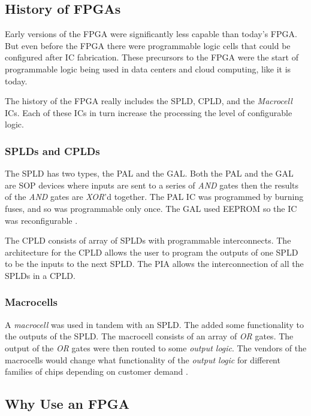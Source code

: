 \subsection{History of FPGAs}

Early versions of the \ac{FPGA} were significantly less capable than today's \ac{FPGA}. But even before the \ac{FPGA} there were programmable logic cells that could be configured after \ac{IC} fabrication. These precursors to the \ac{FPGA} were the start of programmable logic being used in data centers and cloud computing, like it is today.

The history of the \ac{FPGA} really includes the \ac{SPLD}, \ac{CPLD}, and the \emph{Macrocell} \ac{IC}s. Each of these \ac{IC}s in turn increase the processing the level of configurable logic.
	
\subsubsection{SPLDs and CPLDs}

The \ac{SPLD} has two types, the \ac{PAL} and the \ac{GAL}. Both the \ac{PAL} and the \ac{GAL} are \ac{SOP} devices where inputs are sent to a series of \emph{AND} gates then the results of the \emph{AND} gates are \emph{XOR}'d together. The \ac{PAL} \ac{IC} was programmed by burning fuses, and so was programmable only once. The \ac{GAL} used \ac{EEPROM} so the \ac{IC} was reconfigurable \cite{floyd2011digital}.

The \ac{CPLD} consists of array of \ac{SPLD}s with programmable interconnects. The architecture for the \ac{CPLD} allows the user to program the outputs of one \ac{SPLD} to be the inputs to the next \ac{SPLD}. The \ac{PIA} allows the interconnection of all the \ac{SPLD}s in a \ac{CPLD}.
	
\subsubsection{Macrocells}

A \emph{macrocell} was used in tandem with an \ac{SPLD}. The  added some functionality to the outputs of the \ac{SPLD}. The macrocell consists of an array of \emph{OR} gates. The output of the \emph{OR} gates were then routed to some \emph{output logic}. The vendors of the macrocells would change what functionality of the \emph{output logic} for different families of chips depending on customer demand \cite{floyd2011digital}.
	
\subsection{Why Use an FPGA}
	
